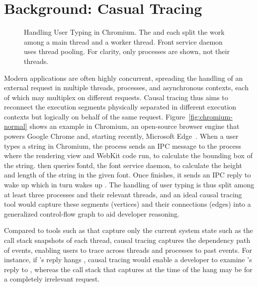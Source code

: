 \section{Background: Casual Tracing} \label{sec:background}

\begin{figure}[tb]
	\footnotesize
    \centering
    \caption{Handling User Typing in Chromium.  The  and
       each split the work among a main thread and a worker
      thread.  Front service daemon  uses thread pooling.  For
      clarity, only processes are shown, not their threads.}
    \label{fig:chromium-case-study}
\end{figure}

Modern applications are often highly concurrent, spreading the handling of
an external request in multiple threads, processes, and asynchronous
contexts, each of which may multiplex on different requests.  Causal
tracing thus aims to reconnect the execution segments physically separated
in different execution contexts but logically on behalf of the same
request.  Figure~\ref{fig:chromium-normal} shows an example in Chromium,
an open-source browser engine that powers Google Chrome and, starting
recently, Microsoft Edge~\cite{chromiumurl}. When a user types a string in
Chromium, the  process sends an IPC message to the 
process where the rendering view and WebKit code run, to calculate the
bounding box of the string.   then queries \v{fontd}, the font
service daemon, to calculate the height and length of the string in the
given font.  Once  finishes, it sends an IPC reply to wake up
 which in turn wakes up .  The handling of user
typing is thus split among at least three processes and their relevant
threads, and an ideal causal tracing tool would capture these segments
(vertices) and their connections (edges) into a generalized control-flow
graph to aid developer reasoning.

Compared to tools such as \spindump that capture only the current system
state such as the call stack snapshots of each thread, causal tracing
captures the dependency path of events, enabling users to trace across
threads and processes to past events.  For instance, if 's
reply hangs , causal tracing would enable a developer to
examine 's reply to , whereas the  call
stack that \spindump captures at the time of the hang may be for a
completely irrelevant request.

